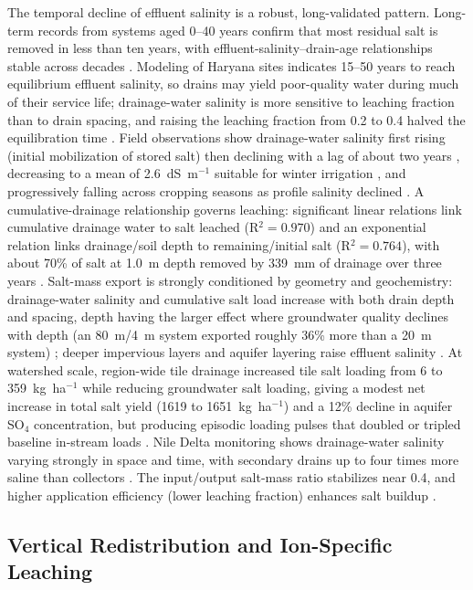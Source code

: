 The temporal decline of effluent salinity is a robust, long-validated pattern. Long-term records from systems aged 0--40 years confirm that most residual salt is removed in less than ten years, with effluent-salinity--drain-age relationships stable across decades \parencite{JOHNSTON1993}. Modeling of Haryana sites indicates 15--50 years to reach equilibrium effluent salinity, so drains may yield poor-quality water during much of their service life; drainage-water salinity is more sensitive to leaching fraction than to drain spacing, and raising the leaching fraction from 0.2 to 0.4 halved the equilibration time \parencite{Kelleners2000}. Field observations show drainage-water salinity first rising (initial mobilization of stored salt) then declining with a lag of about two years \parencite{Manjunatha2004}, decreasing to a mean of 2.6~dS~m$^{-1}$ suitable for winter irrigation \parencite{Sharma2006}, and progressively falling across cropping seasons as profile salinity declined \parencite{Jayawardane2001}. A cumulative-drainage relationship governs leaching: significant linear relations link cumulative drainage water to salt leached (R$^2=0.970$) and an exponential relation links drainage/soil depth to remaining/initial salt (R$^2=0.764$), with about 70\% of salt at 1.0~m depth removed by 339~mm of drainage over three years \parencite{Bahçeci2009}. Salt-mass export is strongly conditioned by geometry and geochemistry: drainage-water salinity and cumulative salt load increase with both drain depth and spacing, depth having the larger effect where groundwater quality declines with depth (an 80~m/4~m system exported roughly 36\% more than a 20~m system) \parencite{GRISMER1993}; deeper impervious layers and aquifer layering raise effluent salinity \parencite{KAMRA1991,KAMRA1994}. At watershed scale, region-wide tile drainage increased tile salt loading from 6 to 359~kg~ha$^{-1}$ while reducing groundwater salt loading, giving a modest net increase in total salt yield (1619 to 1651~kg~ha$^{-1}$) and a 12\% decline in aquifer SO$_4$ concentration, but producing episodic loading pulses that doubled or tripled baseline in-stream loads \parencite{Addab2022}. Nile Delta monitoring shows drainage-water salinity varying strongly in space and time, with secondary drains up to four times more saline than collectors \parencite{ElAgha2020}. The input/output salt-mass ratio stabilizes near 0.4, and higher application efficiency (lower leaching fraction) enhances salt buildup \parencite{KARAJEH1994c}.

\subsection{Vertical Redistribution and Ion-Specific Leaching}


